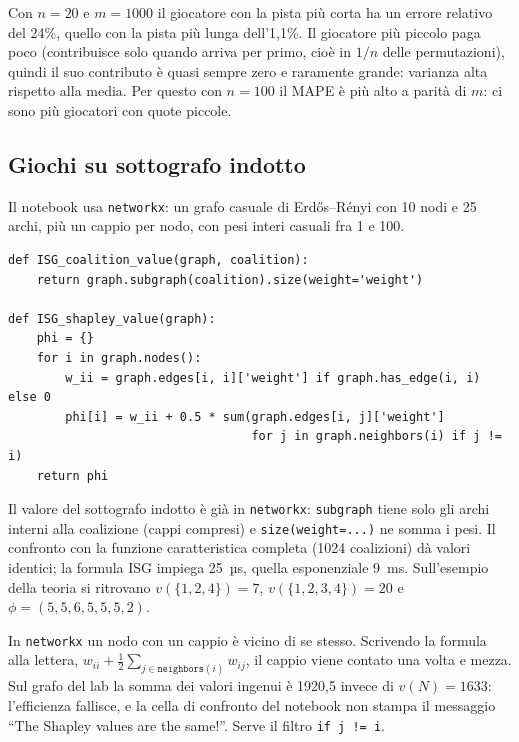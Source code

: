 \begin{osservazione}
Con $n = 20$ e $m = 1000$ il giocatore con la pista più corta ha un errore relativo del 24\%,
quello con la pista più lunga dell'1{,}1\%. Il giocatore più piccolo paga poco (contribuisce
solo quando arriva per primo, cioè in $1/n$ delle permutazioni), quindi il suo contributo è
quasi sempre zero e raramente grande: varianza alta rispetto alla media. Per questo con
$n = 100$ il MAPE è più alto a parità di $m$: ci sono più giocatori con quote piccole.
\end{osservazione}

\subsection{Giochi su sottografo indotto}

Il notebook usa \texttt{networkx}: un grafo casuale di Erdős–Rényi con 10 nodi e 25 archi,
più un cappio per nodo, con pesi interi casuali fra 1 e 100.
\begin{lstlisting}
def ISG_coalition_value(graph, coalition):
    return graph.subgraph(coalition).size(weight='weight')

def ISG_shapley_value(graph):
    phi = {}
    for i in graph.nodes():
        w_ii = graph.edges[i, i]['weight'] if graph.has_edge(i, i) else 0
        phi[i] = w_ii + 0.5 * sum(graph.edges[i, j]['weight']
                                  for j in graph.neighbors(i) if j != i)
    return phi
\end{lstlisting}
Il valore del sottografo indotto è già in \texttt{networkx}: \texttt{subgraph} tiene solo gli
archi interni alla coalizione (cappi compresi) e \texttt{size(weight=...)} ne somma i pesi.
Il confronto con la funzione caratteristica completa (1024 coalizioni) dà valori identici;
la formula ISG impiega 25~µs, quella esponenziale 9~ms. Sull'esempio della teoria si
ritrovano $v(\{1,2,4\}) = 7$, $v(\{1,2,3,4\}) = 20$ e $\phi = (5, 5, 6{,}5, 5{,}5, 2)$.

\begin{attenzione}
In \texttt{networkx} un nodo con un cappio è vicino di se stesso. Scrivendo la formula
alla lettera, $w_{ii} + \frac12\sum_{j \in \texttt{neighbors}(i)} w_{ij}$, il cappio viene
contato una volta e mezza. Sul grafo del lab la somma dei valori ingenui è 1920,5 invece di
$v(N) = 1633$: l'efficienza fallisce, e la cella di confronto del notebook non stampa il
messaggio ``The Shapley values are the same!''.
Serve il filtro \texttt{if j != i}.
\end{attenzione}

